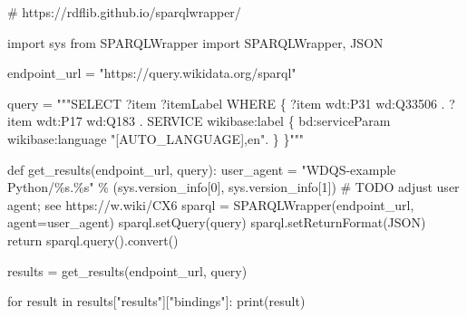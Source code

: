 \documentclass[
  letterpaper,
]{book}
\newenvironment{Shaded}{\begin{snugshade}}{\end{snugshade}}
\newcommand{\AlertTok}[1]{\textcolor[rgb]{0.68,0.00,0.00}{#1}}
\newcommand{\BuiltInTok}[1]{\textcolor[rgb]{0.00,0.23,0.31}{#1}}
\newcommand{\CommentTok}[1]{\textcolor[rgb]{0.37,0.37,0.37}{#1}}
\newcommand{\ControlFlowTok}[1]{\textcolor[rgb]{0.00,0.23,0.31}{#1}}
\newcommand{\DecValTok}[1]{\textcolor[rgb]{0.68,0.00,0.00}{#1}}
\newcommand{\ImportTok}[1]{\textcolor[rgb]{0.00,0.46,0.62}{#1}}
\newcommand{\KeywordTok}[1]{\textcolor[rgb]{0.00,0.23,0.31}{#1}}
\newcommand{\NormalTok}[1]{\textcolor[rgb]{0.00,0.23,0.31}{#1}}
\newcommand{\OperatorTok}[1]{\textcolor[rgb]{0.37,0.37,0.37}{#1}}
\newcommand{\SpecialCharTok}[1]{\textcolor[rgb]{0.37,0.37,0.37}{#1}}
\newcommand{\StringTok}[1]{\textcolor[rgb]{0.13,0.47,0.30}{#1}}
\begin{document}
\begin{Shaded}
\begin{Highlighting}[]
\CommentTok{\# https://rdflib.github.io/sparqlwrapper/}

\ImportTok{import}\NormalTok{ sys}
\ImportTok{from}\NormalTok{ SPARQLWrapper }\ImportTok{import}\NormalTok{ SPARQLWrapper, JSON}

\NormalTok{endpoint\_url }\OperatorTok{=} \StringTok{"https://query.wikidata.org/sparql"}

\NormalTok{query }\OperatorTok{=} \StringTok{"""SELECT ?item ?itemLabel WHERE \{}
\StringTok{  ?item wdt:P31 wd:Q33506 .}
\StringTok{  ?item wdt:P17 wd:Q183 .}
\StringTok{  SERVICE wikibase:label \{ bd:serviceParam wikibase:language "[AUTO\_LANGUAGE],en". \}}
\StringTok{\}"""}


\KeywordTok{def}\NormalTok{ get\_results(endpoint\_url, query):}
\NormalTok{    user\_agent }\OperatorTok{=} \StringTok{"WDQS{-}example Python/}\SpecialCharTok{\%s}\StringTok{.}\SpecialCharTok{\%s}\StringTok{"} \OperatorTok{\%}\NormalTok{ (sys.version\_info[}\DecValTok{0}\NormalTok{], sys.version\_info[}\DecValTok{1}\NormalTok{])}
    \CommentTok{\# }\AlertTok{TODO}\CommentTok{ adjust user agent; see https://w.wiki/CX6}
\NormalTok{    sparql }\OperatorTok{=}\NormalTok{ SPARQLWrapper(endpoint\_url, agent}\OperatorTok{=}\NormalTok{user\_agent)}
\NormalTok{    sparql.setQuery(query)}
\NormalTok{    sparql.setReturnFormat(JSON)}
    \ControlFlowTok{return}\NormalTok{ sparql.query().convert()}


\NormalTok{results }\OperatorTok{=}\NormalTok{ get\_results(endpoint\_url, query)}

\ControlFlowTok{for}\NormalTok{ result }\KeywordTok{in}\NormalTok{ results[}\StringTok{"results"}\NormalTok{][}\StringTok{"bindings"}\NormalTok{]:}
    \BuiltInTok{print}\NormalTok{(result)}

\end{Highlighting}
\end{Shaded}
\end{document}
